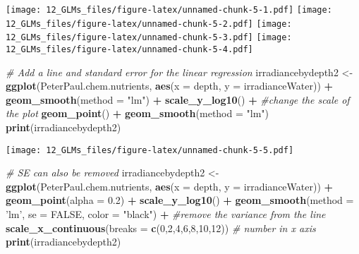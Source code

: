 \documentclass[]{article}
\newenvironment{Shaded}{\begin{snugshade}}{\end{snugshade}}
\newcommand{\KeywordTok}[1]{\textcolor[rgb]{0.13,0.29,0.53}{\textbf{#1}}}
\newcommand{\DataTypeTok}[1]{\textcolor[rgb]{0.13,0.29,0.53}{#1}}
\newcommand{\DecValTok}[1]{\textcolor[rgb]{0.00,0.00,0.81}{#1}}
\newcommand{\FloatTok}[1]{\textcolor[rgb]{0.00,0.00,0.81}{#1}}
\newcommand{\StringTok}[1]{\textcolor[rgb]{0.31,0.60,0.02}{#1}}
\newcommand{\CommentTok}[1]{\textcolor[rgb]{0.56,0.35,0.01}{\textit{#1}}}
\newcommand{\OtherTok}[1]{\textcolor[rgb]{0.56,0.35,0.01}{#1}}
\newcommand{\OperatorTok}[1]{\textcolor[rgb]{0.81,0.36,0.00}{\textbf{#1}}}
\newcommand{\NormalTok}[1]{#1}
\begin{document}
\texttt{[image: 12\_GLMs\_files/figure-latex/unnamed-chunk-5-1.pdf]}
\texttt{[image: 12\_GLMs\_files/figure-latex/unnamed-chunk-5-2.pdf]}
\texttt{[image: 12\_GLMs\_files/figure-latex/unnamed-chunk-5-3.pdf]}
\texttt{[image: 12\_GLMs\_files/figure-latex/unnamed-chunk-5-4.pdf]}

\begin{Shaded}
\begin{Highlighting}[]
\CommentTok{# Add a line and standard error for the linear regression}
\NormalTok{irradiancebydepth2 <-}\StringTok{ }
\StringTok{  }\KeywordTok{ggplot}\NormalTok{(PeterPaul.chem.nutrients, }\KeywordTok{aes}\NormalTok{(}\DataTypeTok{x =}\NormalTok{ depth, }\DataTypeTok{y =}\NormalTok{ irradianceWater)) }\OperatorTok{+}
\StringTok{  }\KeywordTok{geom_smooth}\NormalTok{(}\DataTypeTok{method =} \StringTok{"lm"}\NormalTok{) }\OperatorTok{+}
\StringTok{  }\KeywordTok{scale_y_log10}\NormalTok{() }\OperatorTok{+}\StringTok{ }\CommentTok{#change the scale of the plot}
\StringTok{  }\KeywordTok{geom_point}\NormalTok{() }\OperatorTok{+}
\StringTok{  }\KeywordTok{geom_smooth}\NormalTok{(}\DataTypeTok{method =} \StringTok{"lm"}\NormalTok{) }
\KeywordTok{print}\NormalTok{(irradiancebydepth2) }
\end{Highlighting}
\end{Shaded}

\texttt{[image: 12\_GLMs\_files/figure-latex/unnamed-chunk-5-5.pdf]}

\begin{Shaded}
\begin{Highlighting}[]
\CommentTok{# SE can also be removed}
\NormalTok{irradiancebydepth2 <-}\StringTok{ }
\StringTok{    }\KeywordTok{ggplot}\NormalTok{(PeterPaul.chem.nutrients, }\KeywordTok{aes}\NormalTok{(}\DataTypeTok{x =}\NormalTok{ depth, }\DataTypeTok{y =}\NormalTok{ irradianceWater)) }\OperatorTok{+}
\StringTok{    }\KeywordTok{geom_point}\NormalTok{(}\DataTypeTok{alpha =} \FloatTok{0.2}\NormalTok{) }\OperatorTok{+}
\StringTok{    }\KeywordTok{scale_y_log10}\NormalTok{() }\OperatorTok{+}
\StringTok{    }\KeywordTok{geom_smooth}\NormalTok{(}\DataTypeTok{method =} \StringTok{'lm'}\NormalTok{, }\DataTypeTok{se =} \OtherTok{FALSE}\NormalTok{, }\DataTypeTok{color =} \StringTok{"black"}\NormalTok{) }\OperatorTok{+}\StringTok{ }\CommentTok{#remove the variance from the line}
\StringTok{    }\KeywordTok{scale_x_continuous}\NormalTok{(}\DataTypeTok{breaks =} \KeywordTok{c}\NormalTok{(}\DecValTok{0}\NormalTok{,}\DecValTok{2}\NormalTok{,}\DecValTok{4}\NormalTok{,}\DecValTok{6}\NormalTok{,}\DecValTok{8}\NormalTok{,}\DecValTok{10}\NormalTok{,}\DecValTok{12}\NormalTok{))  }\CommentTok{# number in x axis}
  \KeywordTok{print}\NormalTok{(irradiancebydepth2)}
\end{Highlighting}
\end{Shaded}
\end{document}
